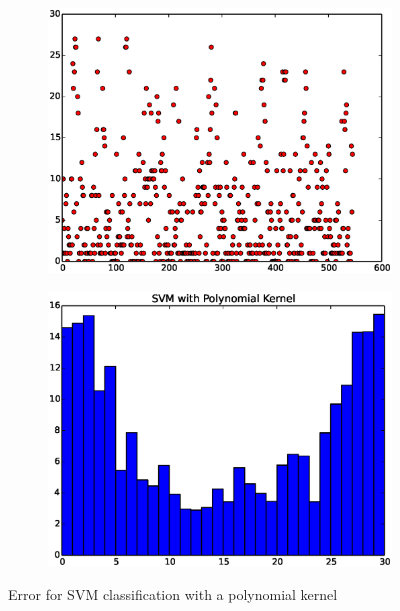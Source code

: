 \documentclass{article}
\begin{document}
\begin{figure}[H]
  \begin{subfigure}[!h]{0.5\textwidth}
    \centering
    \includegraphics[width=\textwidth]{./woodley/SVM_with_Polynomial_Kernel_heading_plot.eps}
  \end{subfigure}
  \begin{subfigure}[!h]{0.5\textwidth}
    \centering
    \includegraphics[width=\textwidth]{./woodley/SVM_with_Polynomial_Kernel_heading_bar.eps}
  \end{subfigure}
  \caption{Error for SVM classification with a polynomial kernel}
\end{figure}
\end{document}
